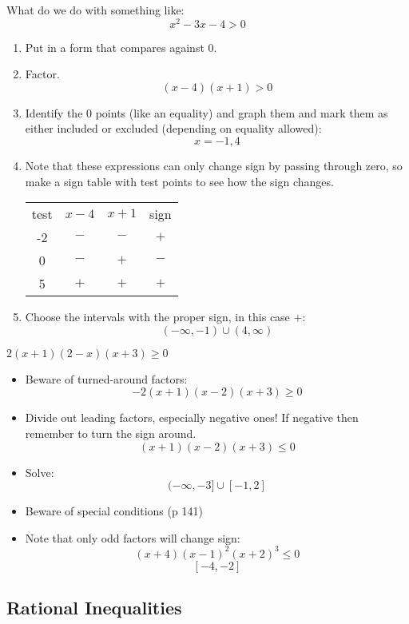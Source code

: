 \documentclass[letterpaper,12pt,fleqn]{article}
\begin{document}
What do we do with something like:
\[x^2-3x-4>0\]
\begin{enumerate}
\item Put in a form that compares against 0.
\item Factor.
  \[(x-4)(x+1)>0\]
\item Identify the 0 points (like an equality) and graph them and mark them as
  either included or excluded (depending on equality allowed):
  \[x=-1,4\]
\item Note that these expressions can only change sign by passing through
  zero, so make a sign table with test points to see how the sign changes.

  \begin{tabular}{cccc}
    test & $x-4$ & $x+1$ & sign \\
    -2 & $-$ & $-$ & $+$ \\
    0 & $-$ & $+$ & $-$ \\
    5 & $+$ & $+$ & $+$ \\
  \end{tabular}

\item Choose the intervals with the proper sign, in this case $+$:
  \[(-\infty,-1)\cup (4,\infty)\]
\end{enumerate}

\begin{example}
  $2(x+1)(2-x)(x+3)\ge0$

  \begin{itemize}
  \item Beware of turned-around factors:
    \[-2(x+1)(x-2)(x+3)\ge0\]
      
  \item Divide out leading factors, especially negative ones! If negative
    then remember to turn the sign around.
    \[(x+1)(x-2)(x+3)\le0\]
      
  \item Solve:
    \[(-\infty,-3]\cup[-1,2]\]

  \item Beware of special conditions (p 141)

  \item Note that only odd factors will change sign:
    \[(x+4)(x-1)^2(x+2)^3\le0\]
    \[[-4,-2]\]
  \end{itemize}
\end{example}
  
\subsection*{Rational Inequalities}
\end{document}
